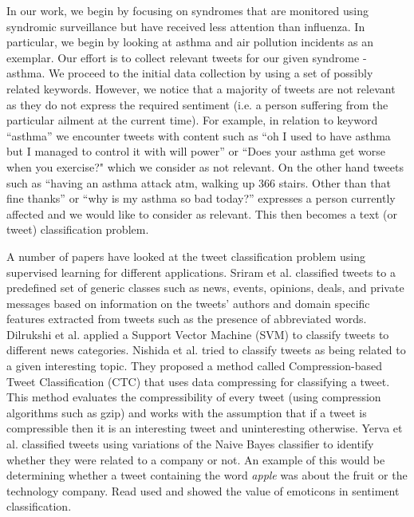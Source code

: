 \documentclass[10pt,letterpaper]{article}
\begin{document}
In our work, we begin by focusing on syndromes that are monitored using syndromic surveillance but have received less attention than influenza.  In particular, we begin by looking at asthma and air pollution incidents as an exemplar. Our effort is to collect relevant tweets for our given syndrome - asthma. We proceed to the initial data collection by using a set of possibly related keywords.  However, we notice that a majority of tweets are not relevant as they do not express the required sentiment (i.e. a person suffering from the particular ailment at the current time).  For example,  in relation to keyword ``asthma'' we encounter tweets with content such as ``oh I used to have asthma but I managed to control it with will power'' or ``Does your asthma get worse when you exercise?" which we consider as not relevant.  On the other hand tweets such as ``having an asthma attack atm, walking up 366 stairs. Other than that fine thanks'' or ``why is my asthma so bad today?'' expresses a person currently affected and we would like to consider as relevant.  This then becomes a text (or tweet) classification problem.  

A number of papers have looked at the tweet classification problem using supervised learning for different applications. Sriram et al. \cite{REF53} classified tweets to a predefined set of generic classes such as news, events, opinions, deals, and private messages based on information on the tweets' authors and domain specific features extracted from tweets such as the presence of abbreviated words. Dilrukshi et al. \cite{REF54} applied a Support Vector Machine (SVM) to classify tweets to different news categories. Nishida et al.  \cite{REF55} tried to classify tweets as being related to a given interesting topic. They proposed a method called Compression-based Tweet Classification (CTC) that uses data compressing for classifying a tweet. This method evaluates the compressibility of every tweet (using compression algorithms such as gzip) and works with the assumption that if a tweet is compressible then it is an interesting tweet and uninteresting otherwise. Yerva et al.  \cite{REF56} classified tweets using variations of the Naive Bayes classifier to identify whether they were related to a company or not. An example of this would be determining whether a tweet containing the word \textit{apple} was about the fruit or the technology company. Read \cite{REF57} used and showed the value of emoticons in sentiment classification.
\end{document}
